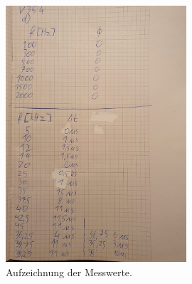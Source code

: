\begin{figure}
    \centering
    \includegraphics[width=0.6\textwidth]{images/Messwerted.jpg}
    \caption{Aufzeichnung der Messwerte.}
\end{figure}